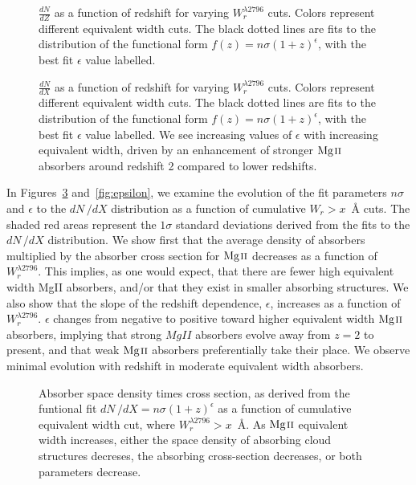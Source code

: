 \documentclass[iop,apj,numberedappendix,appendixfloats,twocolappendix]{emulateapj}
\begin{document}
\begin{figure}[bth]
\caption{$\frac{dN}{dZ}$ as a function of redshift for varying $W_r^{\lambda2796}$ cuts. Colors represent different equivalent width cuts. The black dotted lines are fits to the distribution of the functional form $f(z) = n\sigma (1 + z)^{\epsilon}$, with the best fit $\epsilon$ value labelled.}
\label{fig:dndz_cuts}
\end{figure}

\begin{figure}[bth]
\caption{$\frac{dN}{dX}$ as a function of redshift for varying $W_r^{\lambda2796}$ cuts. Colors represent different equivalent width cuts. The black dotted lines are fits to the distribution of the functional form $f(z) = n\sigma (1 + z)^{\epsilon}$, with the best fit $\epsilon$ value labelled. We see increasing values of $\epsilon$ with increasing equivalent width, driven by an enhancement of stronger ${\hbox{{\rm Mg}\kern 0.1em{\sc ii}}}$ absorbers around redshift 2 compared to lower redshifts.}
\label{fig:dndx_cuts}
\end{figure}

In Figures~\ref{fig:nsigma} and~\ref{fig:epsilon}, we examine the evolution of the fit parameters $n\sigma$ and $\epsilon$ to the $dN\,/dX$ distribution as a function of cumulative $W_r > x$~{\AA} cuts. The shaded red areas represent the $1\sigma$ standard deviations derived from the fits to the $dN\,/dX$ distribution. We show first that the average density of absorbers multiplied by the absorber cross section for ${\hbox{{\rm Mg}\kern 0.1em{\sc ii}}}$ decreases as a function of $W_r^{\lambda2796}$. This implies, as one would expect, that there are fewer high equivalent width MgII absorbers, and/or that they exist in smaller absorbing structures. We also show that the slope of the redshift dependence, $\epsilon$, increases as a function of $W_r^{\lambda2796}$. $\epsilon$ changes from negative to positive toward higher equivalent width ${\hbox{{\rm Mg}\kern 0.1em{\sc ii}}}$ absorbers, implying that strong ${MgII}$ absorbers evolve away from $z = 2$ to present, and that weak ${\hbox{{\rm Mg}\kern 0.1em{\sc ii}}}$ absorbers preferentially take their place. We observe minimal evolution with redshift in moderate equivalent width absorbers.

\begin{figure}[bth]
\caption{Absorber space density times cross section, as derived from the funtional fit $dN\,/dX = n\sigma (1 + z)^{\epsilon}$ as a function of cumulative equivalent width cut, where $W_r^{\lambda2796} > x$~{\AA}. As ${\hbox{{\rm Mg}\kern 0.1em{\sc ii}}}$ equivalent width increases, either the space density of absorbing cloud structures decreses, the absorbing cross-section decreases, or both parameters decrease.}
\label{fig:nsigma}
\end{figure}
\end{document}
